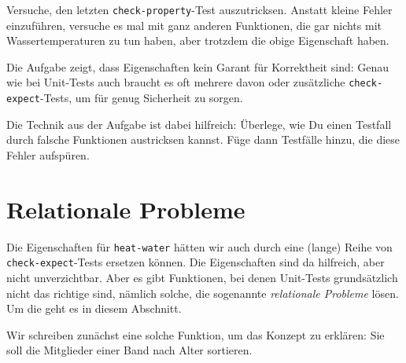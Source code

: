 \begin{aufgabeinline}
  Versuche, den letzten \lstinline{check-property}-Test
  auszutricksen.  Anstatt kleine Fehler einzuführen, versuche es mal
  mit ganz anderen Funktionen, die gar nichts mit Wassertemperaturen
  zu tun haben, aber trotzdem die obige Eigenschaft haben.
\end{aufgabeinline}
%
Die Aufgabe zeigt, dass Eigenschaften kein Garant für Korrektheit
sind: Genau wie bei Unit-Tests auch braucht es oft mehrere davon oder
zusätzliche \lstinline{check-expect}-Tests, um für genug Sicherheit zu
sorgen.

Die Technik aus der Aufgabe ist dabei hilfreich: Überlege, wie Du
einen Testfall durch falsche Funktionen austricksen kannst.  Füge dann
Testfälle hinzu, die diese Fehler aufspüren.



\section{Relationale Probleme}

%
Die Eigenschaften für \lstinline{heat-water} hätten wir auch durch
eine (lange) Reihe von \lstinline{check-expect}-Tests ersetzen können.
Die Eigenschaften sind da hilfreich, aber nicht unverzichtbar.  Aber
es gibt Funktionen, bei denen Unit-Tests grundsätzlich nicht das
richtige sind, nämlich solche, die sogenannte \textit{relationale
  Probleme} lösen.  Um die geht es in diesem Abschnitt.

Wir schreiben zunächst eine solche Funktion, um das Konzept zu
erklären: Sie soll die Mitglieder einer Band nach Alter sortieren.

